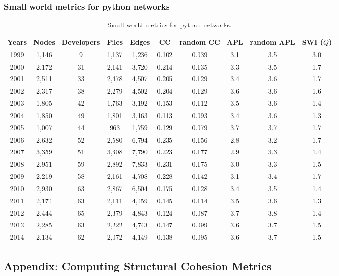 \documentclass[ignorenonframetext,red,8pt,notes=hide]{beamer}
\begin{document}
\begin{frame}
\frametitle{Small world metrics for python networks}
\begin{table}[H]
\begin{center}
\begin{footnotesize}
\begin{tabular}{|c|c|c|c|c|c|c|c|c|c|}
\hline
Years&Nodes&Developers&Files&Edges&CC&random CC&APL&random APL&SWI ($Q$)\\
\hline
1999&1,146&9&1,137&1,236&0.102&0.039&3.1&3.5&3.0\\
2000&2,172&31&2,141&3,720&0.214&0.135&3.3&3.5&1.7\\
2001&2,511&33&2,478&4,507&0.205&0.129&3.4&3.6&1.7\\
2002&2,317&38&2,279&4,502&0.204&0.129&3.6&3.6&1.6\\
2003&1,805&42&1,763&3,192&0.153&0.112&3.5&3.6&1.4\\
2004&1,850&49&1,801&3,163&0.113&0.093&3.4&3.6&1.3\\
2005&1,007&44&963&1,759&0.129&0.079&3.7&3.7&1.7\\
2006&2,632&52&2,580&6,794&0.235&0.156&2.8&3.2&1.7\\
2007&3,359&51&3,308&7,790&0.223&0.177&2.9&3.3&1.4\\
2008&2,951&59&2,892&7,833&0.231&0.175&3.0&3.3&1.5\\
2009&2,219&58&2,161&4,708&0.228&0.142&3.1&3.4&1.7\\
2010&2,930&63&2,867&6,504&0.175&0.128&3.4&3.5&1.4\\
2011&2,174&63&2,111&4,459&0.145&0.114&3.5&3.6&1.3\\
2012&2,444&65&2,379&4,843&0.124&0.087&3.7&3.8&1.4\\
2013&2,285&63&2,222&4,743&0.147&0.099&3.6&3.7&1.5\\
2014&2,134&62&2,072&4,149&0.138&0.095&3.6&3.7&1.5\\
\hline
\end{tabular}
\caption{Small world metrics for python networks.}
\label{swi_python}
\end{footnotesize}
\end{center}
\end{table}


\end{frame}


\subsection{Appendix: Computing Structural Cohesion Metrics}
\end{document}
